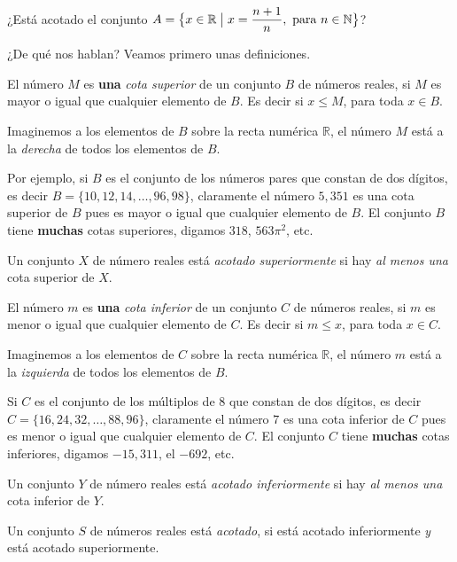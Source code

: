 \documentclass[12pt,letterpaper]{article}
\author{\textsc{Manuel López Mateos}}
\makeatletter
\let\elautor\@author
\newenvironment{definition}[1][Definición.]{\begin{trivlist}
\item[\hskip \labelsep {\bfseries #1}]}{\end{trivlist}}
\makeatother
\begin{document}
%
\bigskip 

\noindent ¿Está acotado el conjunto $A=\bigl\{x\in\mathbb R\bigm| x=\dfrac{n+1}{n},\ \text{para}\ n\in\mathbb N\bigr\}$?

\medskip
\noindent ¿De qué nos hablan? Veamos primero unas definiciones.
\begin{definition}El número $M$ es \textbf{\color{purple}una} \emph{\color{purple}cota superior} de un conjunto $B$ de números reales, si $M$ es mayor o igual que cualquier elemento de $B$. Es decir si $x\le M$, para toda $x\in B$.

Imaginemos a los elementos de $B$ sobre la recta numérica $\mathbb R$, el número $M$ está a la \emph{derecha} de todos los elementos de $B$.
\end{definition}

Por ejemplo, si $B$ es el conjunto de los números pares que constan de dos dígitos, es decir $B=\{10, 12, 14, \ldots, 96, 98\}$, claramente el número $5{,}351$ es una cota superior de $B$ pues es mayor o igual que cualquier elemento de $B$. El conjunto $B$ tiene \textbf{muchas} cotas superiores, digamos $318$, $563\pi^2$, etc.
\begin{definition}
Un conjunto $X$ de número reales está \emph{\color{purple}acotado superiormente} si hay \emph{al menos una} cota superior de $X$.
\end{definition}
\begin{definition}El número $m$ es \textbf{\color{purple}una} \emph{\color{purple}cota inferior} de un conjunto $C$ de números reales, si $m$ es menor o igual que cualquier elemento de $C$. Es decir si $m\le x$, para toda $x\in C$.

Imaginemos a los elementos de $C$ sobre la recta numérica $\mathbb R$, el número $m$ está a la \emph{izquierda} de todos los elementos de $B$.
\end{definition}

Si $C$ es el conjunto de los múltiplos de $8$ que constan de dos dígitos, es decir $C=\{16, 24, 32, \ldots, 88, 96\}$, claramente el número $7$ es una cota inferior de $C$ pues es menor o igual que cualquier elemento de $C$. El conjunto $C$ tiene \textbf{muchas} cotas inferiores, digamos $-15{,}311$, el $-692$, etc.
\begin{definition}
Un conjunto $Y$ de número reales está \emph{\color{purple}acotado inferiormente} si hay \emph{al menos una} cota inferior de $Y$.
\end{definition}
\begin{definition}
Un conjunto $S$ de números reales está \emph{\color{purple}acotado}, si está acotado inferiormente \emph{\color{purple}y} está acotado superiormente.
\end{definition}
\end{document}
